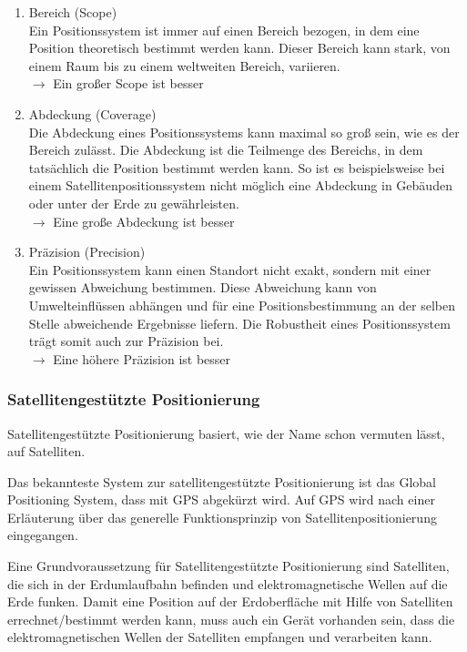 \begin{enumerate}
\item Bereich (Scope)\\
Ein Positionssystem ist immer auf einen Bereich bezogen, in dem eine Position theoretisch bestimmt werden kann. Dieser Bereich kann stark, von einem Raum bis zu einem weltweiten Bereich, variieren.\\
$\longrightarrow$ Ein großer Scope ist besser
\item Abdeckung (Coverage)\\
Die Abdeckung eines Positionssystems kann maximal so groß sein, wie es der Bereich zulässt. Die Abdeckung ist die Teilmenge des Bereichs, in dem tatsächlich die Position bestimmt werden kann. So ist es beispielsweise bei einem Satellitenpositionssystem nicht möglich eine Abdeckung in Gebäuden oder unter der Erde zu gewährleisten.\\
$\longrightarrow$ Eine große Abdeckung ist besser
\item Präzision (Precision)\\
Ein Positionssystem kann einen Standort nicht exakt, sondern mit einer gewissen Abweichung bestimmen. Diese Abweichung kann von Umwelteinflüssen abhängen und für eine Positionsbestimmung an der selben Stelle abweichende Ergebnisse liefern. Die Robustheit eines Positionssystem trägt somit auch zur Präzision bei. \\
$\longrightarrow$ Eine höhere Präzision ist besser
\end{enumerate}
\cite[S.183]{Schiller2004}


\subsubsection{Satellitengestützte Positionierung}

Satellitengestützte Positionierung basiert, wie der Name schon vermuten lässt, auf Satelliten. 

Das bekannteste System zur satellitengestützte Positionierung ist das Global Positioning System, dass mit GPS abgekürzt wird. Auf GPS wird nach einer Erläuterung über das generelle Funktionsprinzip von Satellitenpositionierung eingegangen.

Eine Grundvoraussetzung für Satellitengestützte Positionierung sind Satelliten, die sich in der Erdumlaufbahn befinden und elektromagnetische Wellen auf die Erde funken. Damit eine Position auf der Erdoberfläche mit Hilfe von Satelliten errechnet/bestimmt werden kann, muss auch ein Gerät vorhanden sein, dass die elektromagnetischen Wellen der Satelliten empfangen und verarbeiten kann.

